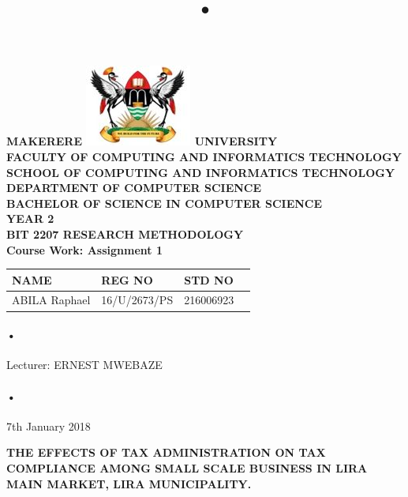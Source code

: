 \documentclass[12pt]{article}
\begin{document}
\begin{Huge}
\begin{center}
\begin{normalsize}
\textbf{MAKERERE \includegraphics[scale=0.5]{logo} UNIVERSITY }\\


\textbf{FACULTY OF COMPUTING AND INFORMATICS TECHNOLOGY} \\
\textbf{SCHOOL OF COMPUTING AND INFORMATICS TECHNOLOGY} \\
\textbf{DEPARTMENT OF COMPUTER SCIENCE} \\
\textbf{BACHELOR OF SCIENCE IN COMPUTER SCIENCE} \\
\textbf{YEAR 2} \\
\textbf{BIT 2207 RESEARCH METHODOLOGY} \\
\textbf{Course Work: Assignment 1}\\
\end{normalsize}
\end{center}
\end{Huge}

\begin{center}
\begin{tabular}{|l|l|l|c|}
\hline NAME  & REG NO & STD NO \\\hline
ABILA Raphael& 16/U/2673/PS & 216006923 \\\hline

\end{tabular}
\paragraph{•}
Lecturer: ERNEST MWEBAZE \\
\paragraph{•}
7th January 2018

\end{center}

\newpage



\title{•}\textbf{THE EFFECTS OF TAX ADMINISTRATION ON TAX COMPLIANCE AMONG SMALL SCALE BUSINESS IN LIRA MAIN MARKET, LIRA MUNICIPALITY.}
\end{document}
